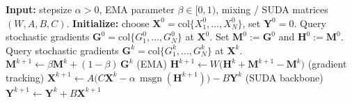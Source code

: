\documentclass{article}
\newcommand{\sudamuon}{SUDA--Muon}
\begin{document}
\begin{algorithm}[t]
\caption{\sudamuon{} (stacked form)}
\label{alg:suda-muon}
\begin{algorithmic}[1]
\State \textbf{Input:} stepsize $\alpha>0$, EMA parameter $\beta\in[0,1)$, mixing / SUDA matrices $(W,A,B,C)$.
\State \textbf{Initialize:} choose $\mathbf{X}^0=\mathrm{col}\{X_1^0,\ldots,X_N^0\}$, set $\mathbf{Y}^0=0$.
\State Query stochastic gradients $\mathbf{G}^0=\mathrm{col}\{G_1^0,\ldots,G_N^0\}$ at $\mathbf{X}^0$.
\State Set $\mathbf{M}^0:=\mathbf{G}^0$ and $\mathbf{H}^0:=\mathbf{M}^0$.
        \State Query stochastic gradients $\mathbf{G}^k=\mathrm{col}\{G_1^k,\ldots,G_N^k\}$ at $\mathbf{X}^k$.
    \EndIf
    \State $\mathbf{M}^{k+1} \gets \beta\mathbf{M}^{k} + (1-\beta)\,\mathbf{G}^{k}$ \hfill (EMA)
    \State $\mathbf{H}^{k+1} \gets W\bigl(\mathbf{H}^k + \mathbf{M}^{k+1}-\mathbf{M}^{k}\bigr)$ \hfill (gradient tracking)
    \State $\mathbf{X}^{k+1} \gets A\bigl(C\mathbf{X}^k - \alpha\,\operatorname{msgn}(\mathbf{H}^{k+1})\bigr) - B\mathbf{Y}^k$ \hfill (SUDA backbone)
    \State $\mathbf{Y}^{k+1} \gets \mathbf{Y}^k + B\mathbf{X}^{k+1}$
\EndFor
\end{algorithmic}
\end{algorithm}
\end{document}
